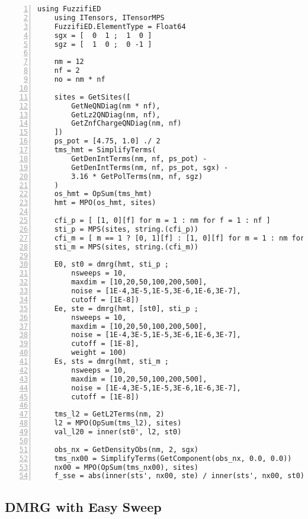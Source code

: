 \documentclass{timesjhep}
\begin{document}
\begin{lstlisting}[numbers=left]
    using FuzzifiED
    using ITensors, ITensorMPS
    FuzzifiED.ElementType = Float64
    sgx = [  0  1 ;  1  0 ]
    sgz = [  1  0 ;  0 -1 ]

    nm = 12
    nf = 2
    no = nm * nf

    sites = GetSites([
        GetNeQNDiag(nm * nf),
        GetLz2QNDiag(nm, nf),
        GetZnfChargeQNDiag(nm, nf)
    ])
    ps_pot = [4.75, 1.0] ./ 2
    tms_hmt = SimplifyTerms(
        GetDenIntTerms(nm, nf, ps_pot) -
        GetDenIntTerms(nm, nf, ps_pot, sgx) -
        3.16 * GetPolTerms(nm, nf, sgz)
    )
    os_hmt = OpSum(tms_hmt)
    hmt = MPO(os_hmt, sites)

    cfi_p = [ [1, 0][f] for m = 1 : nm for f = 1 : nf ]
    sti_p = MPS(sites, string.(cfi_p))
    cfi_m = [ m == 1 ? [0, 1][f] : [1, 0][f] for m = 1 : nm for f = 1 : nf ]
    sti_m = MPS(sites, string.(cfi_m))

    E0, st0 = dmrg(hmt, sti_p ;
        nsweeps = 10,
        maxdim = [10,20,50,100,200,500],
        noise = [1E-4,3E-5,1E-5,3E-6,1E-6,3E-7],
        cutoff = [1E-8])
    Ee, ste = dmrg(hmt, [st0], sti_p ;
        nsweeps = 10,
        maxdim = [10,20,50,100,200,500],
        noise = [1E-4,3E-5,1E-5,3E-6,1E-6,3E-7],
        cutoff = [1E-8],
        weight = 100)
    Es, sts = dmrg(hmt, sti_m ;
        nsweeps = 10,
        maxdim = [10,20,50,100,200,500],
        noise = [1E-4,3E-5,1E-5,3E-6,1E-6,3E-7],
        cutoff = [1E-8])

    tms_l2 = GetL2Terms(nm, 2)
    l2 = MPO(OpSum(tms_l2), sites)
    val_l20 = inner(st0', l2, st0)

    obs_nx = GetDensityObs(nm, 2, sgx)
    tms_nx00 = SimplifyTerms(GetComponent(obs_nx, 0.0, 0.0))
    nx00 = MPO(OpSum(tms_nx00), sites)
    f_sse = abs(inner(sts', nx00, ste) / inner(sts', nx00, st0))
\end{lstlisting}

\subsection{DMRG with Easy Sweep}
\end{document}
